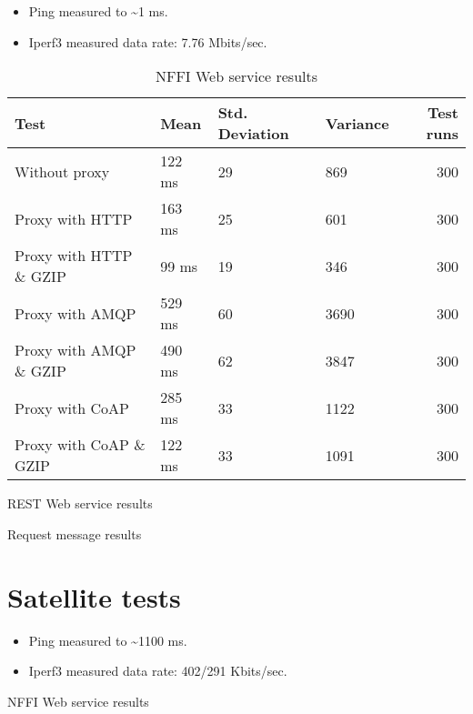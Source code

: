 \begin{appendices}
\begin{itemize}
	\item Ping measured to \textasciitilde 1 ms.
	\item Iperf3 measured data rate: 7.76 Mbits/sec.
\end{itemize}

\begin{table}[H]
\begin{tabular}{llllr}
\hline
 Test                   &   Mean &   Std. Deviation &   Variance &   Test runs \\
\hline
  Without proxy & 122 ms & 29 & 869 & 300 \\
  Proxy with HTTP & 163 ms & 25 & 601 & 300 \\
  Proxy with HTTP \& GZIP & 99 ms & 19 & 346 & 300 \\
  Proxy with AMQP & 529 ms & 60 & 3690 & 300 \\
  Proxy with AMQP \& GZIP & 490 ms & 62 & 3847 & 300\\
  Proxy with CoAP & 285 ms & 33 & 1122 & 300 \\
  Proxy with CoAP \& GZIP & 122 ms & 33 & 1091 & 300 \\
\end{tabular}
\caption{NFFI Web service results}
\end{table}


\begin{table}[H]

\caption{REST Web service results}
\end{table}

\begin{table}[H]

\caption{Request message results}
\end{table}

\section{Satellite tests}

\begin{itemize}
	\item Ping measured to \textasciitilde 1100 ms.
	\item Iperf3 measured data rate: 402/291 Kbits/sec.
\end{itemize}

\begin{table}[H]

\caption{NFFI Web service results}
\end{table}



\end{appendices}
